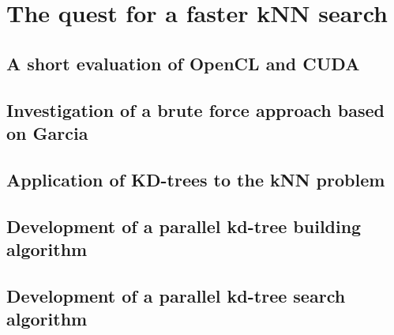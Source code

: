 
\section{The quest for a faster kNN search} %
\label{sec:the_quest_for_a_faster_knn_search}

\subsection{A short evaluation of OpenCL and CUDA} %
\label{sub:a_short_evaluation_of_opencl_and_cuda}


\subsection{Investigation of a brute force approach based on Garcia} %
\label{sub:investigation_of_a_brute_force_approach_based_on_garcia}


\subsection{Application of KD-trees to the kNN problem} %
\label{sub:application_of_kd_trees_to_the_knn_problem}


\subsection{Development of a parallel kd-tree building algorithm} %
\label{sub:development_of_a_parallel_kd_tree_building_algorithm}


\subsection{Development of a parallel kd-tree search algorithm} %
\label{sub:development_of_a_parallel_kd_tree_search_algorithm}


